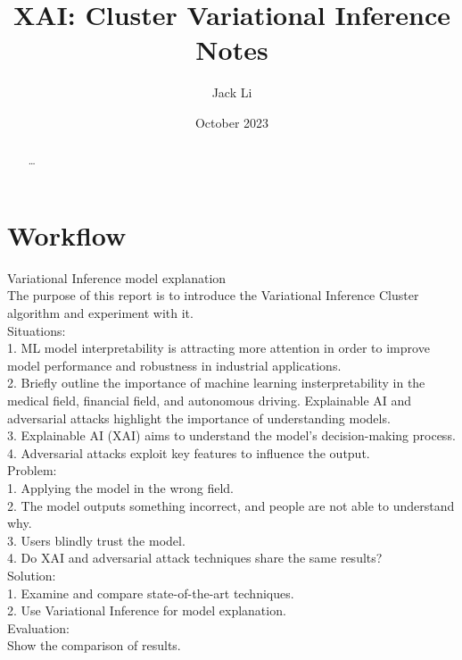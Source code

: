 \documentclass[12pt]{article}
\title{XAI: Cluster Variational Inference Notes}
\author{Jack Li}
\date{October 2023}
\begin{document}
\maketitle

\begin{abstract}
\ldots


\end{abstract}

\section{Workflow}

Variational Inference model explanation\\
The purpose of this report is to introduce the Variational Inference Cluster algorithm and experiment with it. \\

Situations:\\
1. ML model interpretability is attracting more attention in order to improve model performance and robustness in industrial applications.\\
2. Briefly outline the importance of machine learning insterpretability in the medical field, financial field, and autonomous driving. Explainable AI and adversarial attacks highlight the importance of understanding models.\\
3. Explainable AI (XAI) aims to understand the model's decision-making process.\\
4. Adversarial attacks exploit key features to influence the output.\\

Problem:\\
1. Applying the model in the wrong field.\\
2. The model outputs something incorrect, and people are not able to understand why.\\
3. Users blindly trust the model.\\
4. Do XAI and adversarial attack techniques share the same results?\\

Solution:\\
1. Examine and compare state-of-the-art techniques.\\
2. Use Variational Inference for model explanation.\\

Evaluation:\\
Show the comparison of results.\\
\end{document}

